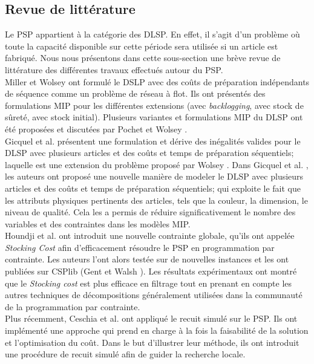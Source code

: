 \documentclass[12pt,a4paper]{article}
\begin{document}
	\subsection{Revue de littérature}
	Le PSP appartient à la catégorie des DLSP. En effet, il s'agit d'un problème où toute la capacité disponible sur cette période sera utilisée si un article est fabriqué. Nous nous présentons dans cette sous-section une brève revue de littérature des différentes travaux effectués autour du PSP. \\
	\hspace*{.5cm} Miller et Wolsey \cite{miller_wolsey} ont formulé le DSLP avec des coûts de préparation indépendants de séquence comme un problème de réseau à flot. Ils ont présentés des formulations MIP pour les différentes extensions (avec \emph{backlogging}, avec stock de sûreté, avec stock initial). Plusieurs variantes et formulations MIP du DLSP ont été proposées et discutées par Pochet et Wolsey \cite{pochet_wolsey}. \\
	\hspace*{.5cm} Gicquel et al. \cite{gicquel_minoux_dallery} présentent une formulation et dérive des inégalités valides pour le DLSP avec plusieurs articles et des coûts et temps de préparation séquentiels; laquelle est une extension du problème proposé par Wolsey \cite{wolsey}. Dans Gicquel et al. \cite {gicquel_miegeville_minoux_dallery}, les auteurs ont proposé une nouvelle manière de modeler le DLSP avec plusieurs articles et des coûts et temps de préparation séquentiels; qui exploite le fait que les attributs physiques pertinents des articles, tels que la couleur, la dimension, le niveau de qualité. Cela les a permis de réduire significativement le nombre des variables et des contraintes dans les modèles MIP.\\
	\hspace*{.5cm}Houndji et al. \cite{hvr_stockingCost} ont introduit une nouvelle contrainte globale, qu'ils ont appelée \emph{Stocking Cost} afin d'efficacement résoudre le PSP en programmation par contrainte. Les auteurs l'ont alors testée sur de nouvelles instances et les ont publiées sur CSPlib (Gent et Walsh \cite{gent_walsh}). Les résultats expérimentaux ont montré que le \emph{Stocking cost} est plus efficace en filtrage tout en prenant en compte les autres techniques de décompositions généralement utilisées dans la communauté de la programmation par contrainte. \\
	\hspace*{.5cm} Plus récemment, Ceschia et al. \cite{ceschia} ont appliqué le recuit simulé sur le PSP. Ils ont implémenté une approche qui prend en charge à la fois la faisabilité de la solution et l'optimisation du coût. Dans le but d'illustrer leur méthode, ils ont introduit une procédure de recuit simulé afin de guider la recherche locale.
	 
\end{document}
